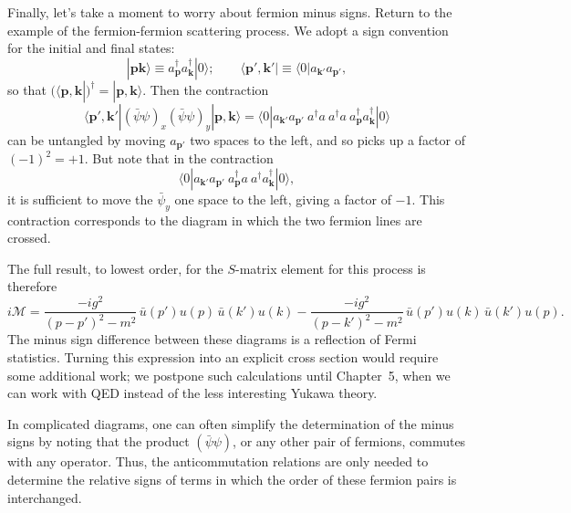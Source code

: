 Finally, let's take a moment to worry about fermion minus signs.  Return to
the example of the fermion-fermion scattering process.  We adopt a sign
convention for the initial and final states:
\begin{equation}
  |\mathbf{p}\mathbf{k}\rangle \equiv a_{\mathbf{p}}^\dagger
    a_{\mathbf{k}}^\dagger|0\rangle;\qquad
  \langle \mathbf{p}',\mathbf{k}'| \equiv \langle 0|a_{\mathbf{k}'}
    a_{\mathbf{p}'} ,
  \label{eq:4.120}
\end{equation}
so that $(\langle\mathbf{p},\mathbf{k}|)^\dagger = |\mathbf{p},\mathbf{k}\rangle$.
Then the contraction
\begin{equation}
  \langle \mathbf{p}',\mathbf{k}'|(\bar{\psi}\psi)_x(\bar{\psi}\psi)_y
    |\mathbf{p},\mathbf{k}\rangle
  = \langle 0|a_{\mathbf{k}'}a_{\mathbf{p}'}\ a^\dagger a\ a^\dagger a\
    a_{\mathbf{p}}^\dagger a_{\mathbf{k}}^\dagger|0\rangle
\end{equation}
can be untangled by moving $a_{\mathbf{p}'}$ two spaces to the left, and so
picks up a factor of $(-1)^2 = +1$.  But note that in the contraction
\begin{equation}
  \langle 0|a_{\mathbf{k}'}a_{\mathbf{p}'}\ a_{\mathbf{p}}^\dagger a\ a^\dagger
    a_{\mathbf{k}}^\dagger|0\rangle ,
\end{equation}
it is sufficient to move the $\bar{\psi}_y$ one space to the left, giving a
factor of $-1$.  This contraction corresponds to the diagram in which the
two fermion lines are crossed.

The full result, to lowest order, for the $S$-matrix element for this process
is therefore
\begin{equation}
  i\mathcal{M} = \frac{-ig^2}{(p-p')^2-m^2}\,
    \bar{u}(p')u(p)\,\bar{u}(k')u(k)
    - \frac{-ig^2}{(p-k')^2-m^2}\,
    \bar{u}(p')u(k)\,\bar{u}(k')u(p) .
  \label{eq:4.121}
\end{equation}
The minus sign difference between these diagrams is a reflection of Fermi
statistics.  Turning this expression into an explicit cross section would
require some additional work; we postpone such calculations until Chapter~5,
when we can work with QED instead of the less interesting Yukawa theory.

In complicated diagrams, one can often simplify the determination of the
minus signs by noting that the product $(\bar{\psi}\psi)$, or any other pair
of fermions, commutes with any operator.  Thus, the anticommutation relations
are only needed to determine the relative signs of terms in which the order
of these fermion pairs is interchanged.

